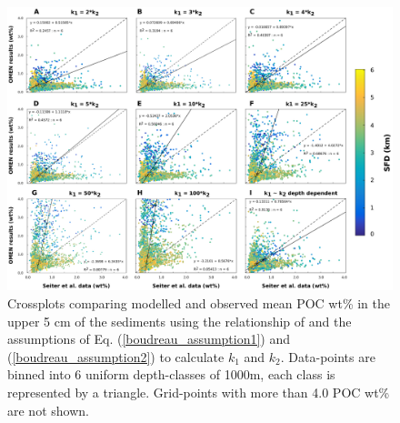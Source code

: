 \documentclass[gmd, manuscript]{copernicus}
\begin{document}
\begin{figure}[htbp]
\begin{center}
	\includegraphics[width=1.0\textwidth]{figures/OMEN-GENIE-Exp/0_Boudreau_CROSSPLOTS_170717.pdf}
	\caption{Crossplots comparing modelled and observed mean POC wt\% in the upper 5 cm of the sediments using the relationship of \citet{boudreau1997diagenetic} and the assumptions of Eq. (\ref{boudreau_assumption1}) and 
	(\ref{boudreau_assumption2}) to calculate $k_1$ and $k_2$.  Data-points are binned into 6 uniform depth-classes of 1000m, each class is represented by a triangle. 
	Grid-points with more than 4.0 POC wt\% are not shown.}
	\label{fig:OMEN_GENIE_Boudreau_results}
\end{center}
\end{figure}
\end{document}
